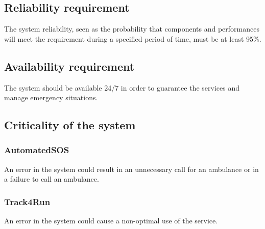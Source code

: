 \subsection{Reliability requirement}
The system reliability, seen as the probability that components and performances will meet the requirement during a specified period of time, must be at least 95\%.

\subsection{Availability requirement}
The system should be available 24/7 in order to guarantee the services and manage emergency situations.

\subsection{Criticality of the system}
\subsubsection{AutomatedSOS}
An error in the system could result in an unnecessary call for an ambulance or in a failure to call an ambulance.
\subsubsection{Track4Run}
An error in the system could cause a non-optimal use of the service.


